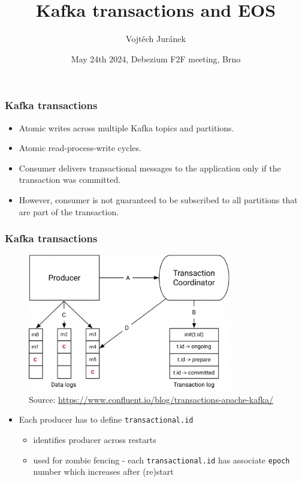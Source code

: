 \documentclass[10pt,utf8]{beamer}
\title{Kafka transactions and EOS}
\author{Vojtěch Juránek}
\institute[Red Hat]{Red Hat}
\date{May 24th 2024, Debezium F2F meeting, Brno}
\begin{document}


\begin{frame}
    \titlepage
\end{frame}

\begin{frame}
    \frametitle{Kafka transactions}
    \begin{itemize}
        \item Atomic writes across multiple Kafka topics and partitions.
        \item Atomic read-process-write cycles.
        \item Consumer delivers transactional messages to the application only if the transaction was committed.
        \item However, consumer is not guaranteed to be subscribed to all partitions that are part of the transaction.
    \end{itemize}
\end{frame}

\begin{frame}
    \frametitle{Kafka transactions}
    \begin{figure}
        \centering
        \includegraphics[height=6cm]{./img/kafka_transactions.eps}
        \caption{\tiny{Source: \url{https://www.confluent.io/blog/transactions-apache-kafka/}}}
    \end{figure}
\end{frame}


\begin{frame}
    \begin{itemize}
        \item Each producer has to define \texttt{transactional.id}
        \begin{itemize}
            \item identifies producer across restarts
            \item used for zombie fencing - each \texttt{transactional.id} has associate \texttt{epoch} number which increases after (re)start
        \end{itemize}
    \end{itemize}
\end{frame}
\end{document}
